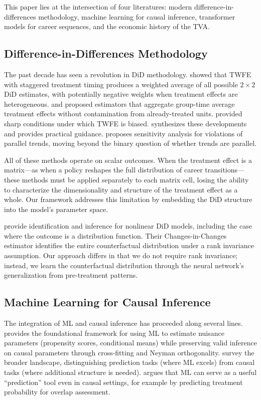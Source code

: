 \documentclass[12pt]{article}
\begin{document}
This paper lies at the intersection of four literatures: modern difference-in-differences methodology, machine learning for causal inference, transformer models for career sequences, and the economic history of the TVA.

\subsection{Difference-in-Differences Methodology}

The past decade has seen a revolution in DiD methodology. \citet{goodmanBacon2021difference} showed that TWFE with staggered treatment timing produces a weighted average of all possible $2 \times 2$ DiD estimates, with potentially negative weights when treatment effects are heterogeneous. \citet{callaway2021difference} and \citet{sunAbraham2021} proposed estimators that aggregate group-time average treatment effects without contamination from already-treated units. \citet{deChaisemartin2020two} provided sharp conditions under which TWFE is biased. \citet{roth2023s} synthesizes these developments and provides practical guidance. \citet{rambachanRoth2023} proposes sensitivity analysis for violations of parallel trends, moving beyond the binary question of whether trends are parallel.

All of these methods operate on scalar outcomes. When the treatment effect is a matrix---as when a policy reshapes the full distribution of career transitions---these methods must be applied separately to each matrix cell, losing the ability to characterize the dimensionality and structure of the treatment effect as a whole. Our framework addresses this limitation by embedding the DiD structure into the model's parameter space.

\citet{atheyImbens2006} provide identification and inference for nonlinear DiD models, including the case where the outcome is a distribution function. Their Changes-in-Changes estimator identifies the entire counterfactual distribution under a rank invariance assumption. Our approach differs in that we do not require rank invariance; instead, we learn the counterfactual distribution through the neural network's generalization from pre-treatment patterns.

\subsection{Machine Learning for Causal Inference}

The integration of ML and causal inference has proceeded along several lines. \citet{chernozhukov2018double} provides the foundational framework for using ML to estimate nuisance parameters (propensity scores, conditional means) while preserving valid inference on causal parameters through cross-fitting and Neyman orthogonality. \citet{atheyImbens2019} survey the broader landscape, distinguishing prediction tasks (where ML excels) from causal tasks (where additional structure is needed). \citet{mullainathan2017machine} argues that ML can serve as a useful ``prediction'' tool even in causal settings, for example by predicting treatment probability for overlap assessment.
\end{document}
